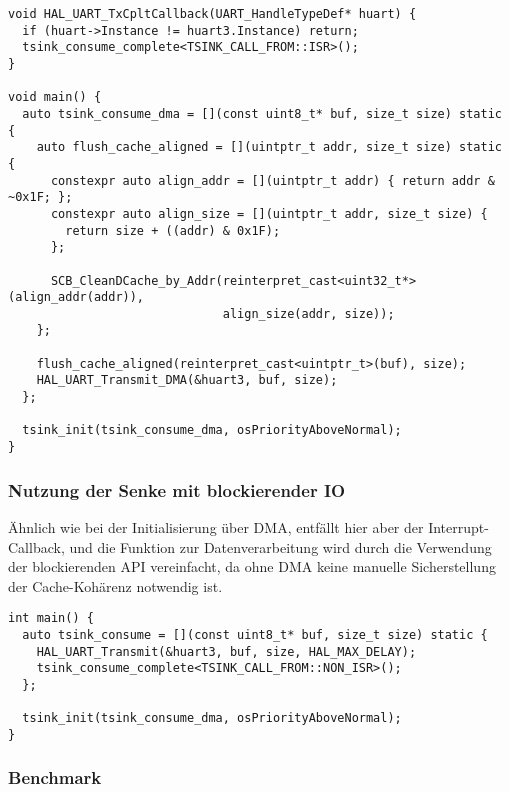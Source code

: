 \begin{code}
\begin{verbatim}
void HAL_UART_TxCpltCallback(UART_HandleTypeDef* huart) {
  if (huart->Instance != huart3.Instance) return;
  tsink_consume_complete<TSINK_CALL_FROM::ISR>();
}

void main() {
  auto tsink_consume_dma = [](const uint8_t* buf, size_t size) static {
    auto flush_cache_aligned = [](uintptr_t addr, size_t size) static {
      constexpr auto align_addr = [](uintptr_t addr) { return addr & ~0x1F; };
      constexpr auto align_size = [](uintptr_t addr, size_t size) {
        return size + ((addr) & 0x1F);
      };

      SCB_CleanDCache_by_Addr(reinterpret_cast<uint32_t*>(align_addr(addr)),
                              align_size(addr, size));
    };

    flush_cache_aligned(reinterpret_cast<uintptr_t>(buf), size);
    HAL_UART_Transmit_DMA(&huart3, buf, size);
  };

  tsink_init(tsink_consume_dma, osPriorityAboveNormal);
}
\end{verbatim}
\end{code}

\subsubsection{Nutzung der Senke mit blockierender IO}

Ähnlich wie bei der Initialisierung über DMA, entfällt hier aber der
Interrupt-Callback, und die Funktion zur Datenverarbeitung wird durch die
Verwendung der blockierenden API vereinfacht, da ohne DMA keine manuelle
Sicherstellung der Cache-Kohärenz notwendig ist.

\begin{code}
\begin{verbatim}
int main() {
  auto tsink_consume = [](const uint8_t* buf, size_t size) static {
    HAL_UART_Transmit(&huart3, buf, size, HAL_MAX_DELAY);
    tsink_consume_complete<TSINK_CALL_FROM::NON_ISR>();
  };

  tsink_init(tsink_consume_dma, osPriorityAboveNormal);
}
\end{verbatim}
\end{code}

\subsubsection{Benchmark}

